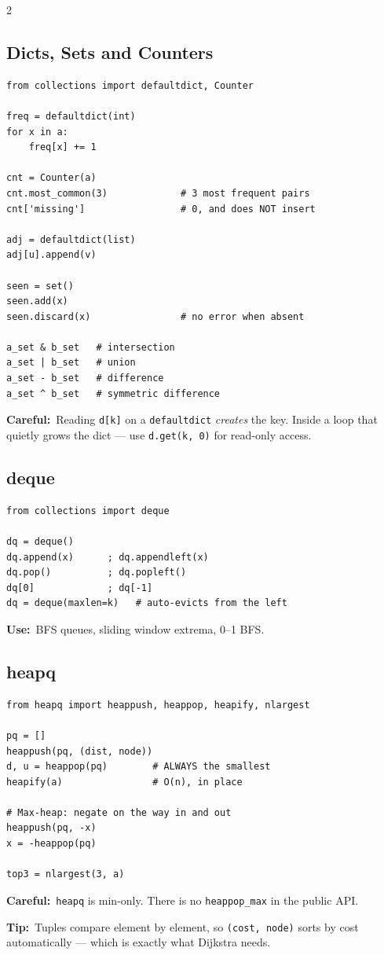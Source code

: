 \documentclass[10pt]{article}
\newcommand{\code}[1]{\texttt{\small #1}}
\newcommand{\uses}[1]{{\color{accent2}\footnotesize\textbf{Use:}}~{\footnotesize #1}\par}
\newcommand{\tip}[1]{{\color{tipc}\footnotesize\textbf{Tip:}}~{\footnotesize #1}\par}
\newcommand{\warn}[1]{{\color{warnc}\footnotesize\textbf{Careful:}}~{\footnotesize #1}\par}
\begin{document}
\begin{multicols}{2}
\subsection{Dicts, Sets and Counters}
\begin{lstlisting}
from collections import defaultdict, Counter

freq = defaultdict(int)
for x in a:
    freq[x] += 1

cnt = Counter(a)
cnt.most_common(3)             # 3 most frequent pairs
cnt['missing']                 # 0, and does NOT insert

adj = defaultdict(list)
adj[u].append(v)

seen = set()
seen.add(x)
seen.discard(x)                # no error when absent

a_set & b_set   # intersection
a_set | b_set   # union
a_set - b_set   # difference
a_set ^ b_set   # symmetric difference
\end{lstlisting}
\warn{Reading \code{d[k]} on a \code{defaultdict} \emph{creates} the
key. Inside a loop that quietly grows the dict --- use
\code{d.get(k, 0)} for read-only access.}

\subsection{deque}
\begin{lstlisting}
from collections import deque

dq = deque()
dq.append(x)      ; dq.appendleft(x)
dq.pop()          ; dq.popleft()
dq[0]             ; dq[-1]
dq = deque(maxlen=k)   # auto-evicts from the left
\end{lstlisting}
\uses{BFS queues, sliding window extrema, 0--1 BFS.}

\subsection{heapq}
\begin{lstlisting}
from heapq import heappush, heappop, heapify, nlargest

pq = []
heappush(pq, (dist, node))
d, u = heappop(pq)        # ALWAYS the smallest
heapify(a)                # O(n), in place

# Max-heap: negate on the way in and out
heappush(pq, -x)
x = -heappop(pq)

top3 = nlargest(3, a)
\end{lstlisting}
\warn{\code{heapq} is min-only. There is no \code{heappop\_max} in the
public API.}
\tip{Tuples compare element by element, so \code{(cost, node)} sorts by
cost automatically --- which is exactly what Dijkstra needs.}


\end{multicols}
\end{document}
